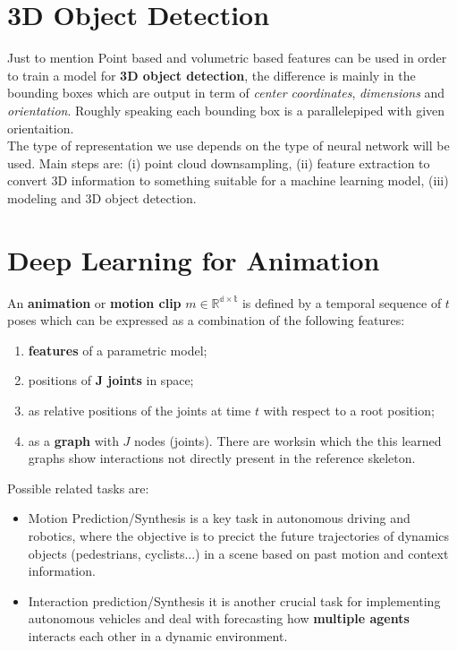 \section{3D Object Detection}
Just to mention Point based and volumetric based features can be used in order to train a model for \textbf{3D object detection}, the difference is mainly in the bounding boxes which are output in term of \textit{center coordinates}, \textit{dimensions} and \textit{orientation}. Roughly speaking each bounding box is a parallelepiped with given orientaition. \\The type of representation we use depends on the type of neural network will be used. Main 
steps are: (i) point cloud downsampling, (ii) feature extraction to convert 3D information to something suitable for a machine learning model, (iii) modeling and 3D object detection.

\section{Deep Learning for Animation}
An \textbf{animation} or \textbf{motion clip} $m\in\mathbb{R^{d\times{t}}}$ is defined by a temporal sequence of $t$ poses which can be expressed as a combination of the following features:
\begin{enumerate}
    \itemsep-0.3em
    \item \textbf{features} of a parametric model;
    \item positions of \textbf{J joints} in space; 
    \item as relative positions of the joints at time $t$ with respect to a root position;
    \item as a \textbf{graph} with $J$ nodes (joints). There are worksin which the this learned graphs show interactions not directly present in the reference skeleton.
\end{enumerate}

Possible related tasks are: 
\begin{itemize}
    \itemsep-0.3em
    \item \textsf{Motion Prediction/Synthesis} is a key task in autonomous driving and robotics, where the objective is to precict the future trajectories of dynamics objects (pedestrians, cyclists...) in a scene based on past motion and context information.
    \item \textsf{Interaction prediction/Synthesis} it is another crucial task for implementing autonomous vehicles and deal with forecasting how \textbf{multiple agents} interacts each other in a dynamic environment.
\end{itemize}

